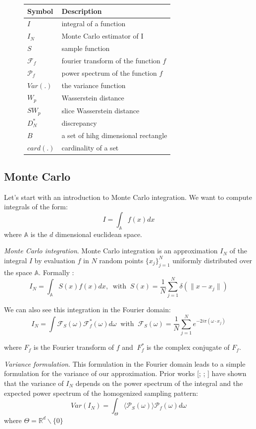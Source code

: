 \documentclass{classeENS}
\begin{document}
\begin{figure}[H]
    \centering
    \begin{tabular}{C{2cm} L{10cm}}
    \hline  
        Symbol & Description
    \tabularnewline 
    \hline
        $I$ & integral of a function
    \tabularnewline
        $I_N$ & Monte Carlo estimator of I
    \tabularnewline
        $S$ & sample function
    \tabularnewline
        $\mathcal F_f$ & fourier transform of the function $f$
    \tabularnewline
        $\mathcal P_f$ & power spectrum of the function $f$
    \tabularnewline
        $Var(.)$ & the variance function
    \tabularnewline
        $W_p$ & Wasserstein distance
    \tabularnewline
        $SW_p$ & slice Wasserstein distance
    \tabularnewline
        $D_N^*$ & discrepancy
    \tabularnewline
        $B$ & a set of hihg dimensional rectangle
    \tabularnewline
        $card(.)$ & cardinality of a set
    \tabularnewline
    \hline 
    \end{tabular}
\end{figure}

\subsection{Monte Carlo}

Let's start with an introduction to Monte Carlo integration. We want to compute integrals of 
the form:
    \[ I = \int_{\mathbb A} f(x) dx\]
where $\mathbb A$ is the $d$ dimensional euclidean space.

\> \textit{Monte Carlo integration}. Monte Carlo integration is an approximation
    $I_N$ of the integral $I$ by evaluation $f$ in $N$ random points $\{x_j\}_{j=1}^N$ uniformly 
    distributed over the space $\mathbb A$. Formally :
    \[ I_N = \int_{\mathbb A} S(x)f(x)dx, 
        \: \text{ with } \:
    S(x) = \frac{1}{N} \sum_{j=1}^N \delta(\lVert x-x_j \rVert) \] 

\noindent We can also see this integration in the Fourier domain:
\[I_N = \int \mathcal F_S(\omega) \mathcal F_f^*(\omega) d\omega 
    \: \text{ with } \:
    \mathcal F_S(\omega) = \frac{1}{N} \sum_{j=1}^N e^{-2i\pi(\omega\cdot x_j)} \]

    \noindent where $F_f$ is the Fourier transform of $f$ and $\ F_f^*$ is the 
    complex conjugate of $F_f$.

\> \textit{Variance formulation}. This formulation in the Fourier domain leads to a simple
    formulation for the variance of our approximation. Prior works  [\cite{Durand2011AFA}; \cite{Pilleboue:2015:VAMCI}; \cite{10.1145/2461912.2462013}] 
    have shown that the variance of $I_N$ depends on the power spectrum of the integral 
    and the expected power spectrum of the homogenized sampling pattern:
    \[ Var(I_N) = \int_\Theta \langle \mathcal P_S(\omega)\rangle \mathcal P_f(\omega) d\omega \]
    \noindent where $\Theta = \mathbb R^d\backslash\{0\} $
\end{document}

